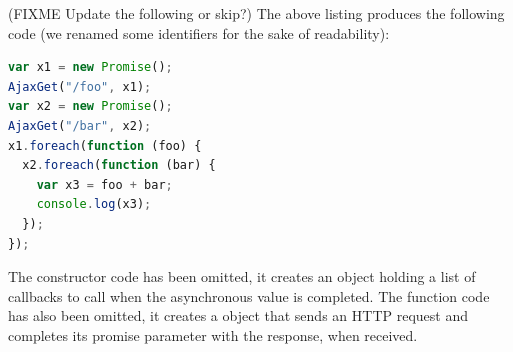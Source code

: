 \documentclass[american,english,runningheads]{llncs}
\begin{document}
(FIXME Update the following or skip?) The above listing produces the following code (we renamed some identifiers for the sake of readability):

\begin{lstlisting}[language=JavaScript]
var x1 = new Promise();
AjaxGet("/foo", x1);
var x2 = new Promise();
AjaxGet("/bar", x2);
x1.foreach(function (foo) {
  x2.foreach(function (bar) {
    var x3 = foo + bar;
    console.log(x3);
  });
});
\end{lstlisting}

The  constructor code has been omitted, it creates an object holding a list of callbacks to call when the asynchronous value is completed. The  function code has also been omitted, it creates a  object that sends an HTTP request and completes its promise parameter with the response, when received.
\end{document}

